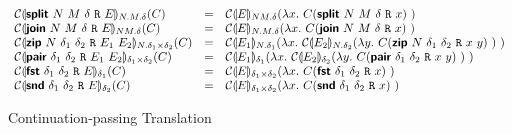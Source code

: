 \begin{figure}
\begin{displaymath}
\begin{array}{lcl}
      \mathcal{C}\llparenthesis \bm{\mathsf{split}}~N~M~\delta~\mathtt{R}~E \rrparenthesis_{N.M.\delta}(C)
      &=& \mathcal{C}\llparenthesis E \rrparenthesis_{NM.\delta}(\lambda x.~C(\bm{\mathsf{split}}~N~M~\delta~\mathtt{R}~x)~)
      \\
      \mathcal{C}\llparenthesis \bm{\mathsf{join}}~N~M~\delta~\mathtt{R}~E \rrparenthesis_{NM.\delta}(C)
      &=& \mathcal{C}\llparenthesis E \rrparenthesis_{N.M.\delta}(\lambda x.~C(\bm{\mathsf{join}}~N~M~\delta~\mathtt{R}~x)~)
      \\
      \mathcal{C}\llparenthesis \bm{\mathsf{zip}}~N~\delta_1~\delta_2~\mathtt{R}~E_1~E_2 \rrparenthesis_{N.\delta_1 \times \delta_2}(C)
      &=& \mathcal{C}\llparenthesis E_1 \rrparenthesis_{N.\delta_1}(\lambda x.~\mathcal{C}\llparenthesis E_2 \rrparenthesis_{N.\delta_2}(\lambda y.~C(\bm{\mathsf{zip}}~N~\delta_1~\delta_2~\mathtt{R}~x~y)~)~)
      \\
      \mathcal{C}\llparenthesis \bm{\mathsf{pair}}~\delta_1~\delta_2~\mathtt{R}~E_1~E_2 \rrparenthesis_{\delta_1\times\delta_2}(C)
      &=& \mathcal{C}\llparenthesis E_1 \rrparenthesis_{\delta_1}(\lambda x.~\mathcal{C}\llparenthesis E_2 \rrparenthesis_{\delta_2}(\lambda y.~C(\bm{\mathsf{pair}}~\delta_1~\delta_2~\mathtt{R}~x~y)~)~)
      \\
      \mathcal{C}\llparenthesis \bm{\mathsf{fst}}~\delta_1~\delta_2~\mathtt{R}~E \rrparenthesis_{\delta_1}(C)
      &=& \mathcal{C}\llparenthesis E \rrparenthesis_{\delta_1\times\delta_2}(\lambda x.~C(\bm{\mathsf{fst}}~\delta_1~\delta_2~\mathtt{R}~x)~)
      \\
      \mathcal{C}\llparenthesis \bm{\mathsf{snd}}~\delta_1~\delta_2~\mathtt{R}~E \rrparenthesis_{\delta_2}(C)
      &=& \mathcal{C}\llparenthesis E \rrparenthesis_{\delta_1\times\delta_2}(\lambda x.~C(\bm{\mathsf{snd}}~\delta_1~\delta_2~\mathtt{R}~x)~)
      \\
    \end{array}
  \end{displaymath}
  \caption{Continuation-passing Translation}\label{fig:con-trans}
\end{figure}

